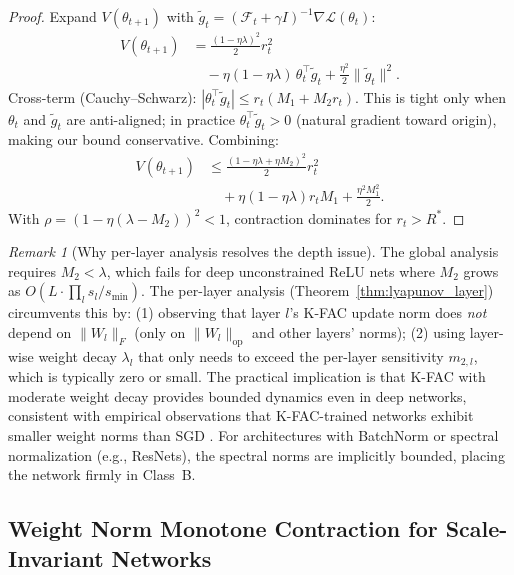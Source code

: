 \documentclass{article}
\providecommand{\FIM}{\mathcal{F}}
\providecommand{\norm}[1]{\lVert #1 \rVert}
\theoremstyle{plain}
\theoremstyle{definition}
\theoremstyle{remark}
\newtheorem{remark}{Remark}
\begin{document}
\begin{proof}
Expand $V(\theta_{t+1})$ with $\tilde{g}_t = (\FIM_t + \gamma I)^{-1}\nabla\mathcal{L}(\theta_t)$:
\begin{align}
    V(\theta_{t+1}) &= \tfrac{(1-\eta\lambda)^2}{2}r_t^2 \nonumber \\
    &\quad - \eta(1\!-\!\eta\lambda)\,\theta_t^\top \tilde{g}_t + \tfrac{\eta^2}{2}\norm{\tilde{g}_t}^2.
\end{align}
Cross-term (Cauchy--Schwarz): $|\theta_t^\top\tilde{g}_t| \leq r_t(M_1 + M_2 r_t)$. This is tight only when $\theta_t$ and $\tilde{g}_t$ are anti-aligned; in practice $\theta_t^\top\tilde{g}_t > 0$ (natural gradient toward origin), making our bound conservative. Combining:
\begin{align}
    V(\theta_{t+1}) &\leq \frac{(1\!-\!\eta\lambda\!+\!\eta M_2)^2}{2}r_t^2 \nonumber \\
    &\quad + \eta(1\!-\!\eta\lambda)r_t M_1 + \frac{\eta^2 M_1^2}{2}.
\end{align}
With $\rho = (1 - \eta(\lambda - M_2))^2 < 1$, contraction dominates for $r_t > R^*$.
\end{proof}

\begin{remark}[Why per-layer analysis resolves the depth issue]
\label{rem:tightness}
The global analysis requires $M_2 < \lambda$, which fails for deep unconstrained ReLU nets where $M_2$ grows as $O(L \cdot \prod_l s_l / s_{\min})$. The per-layer analysis (Theorem~\ref{thm:lyapunov_layer}) circumvents this by: (1) observing that layer $l$'s K-FAC update norm does \emph{not} depend on $\norm{W_l}_F$ (only on $\norm{W_l}_{\mathrm{op}}$ and other layers' norms); (2) using layer-wise weight decay $\lambda_l$ that only needs to exceed the per-layer sensitivity $m_{2,l}$, which is typically zero or small. The practical implication is that K-FAC with moderate weight decay provides bounded dynamics even in deep networks, consistent with empirical observations that K-FAC-trained networks exhibit smaller weight norms than SGD \citep{dohare2024loss}. For architectures with BatchNorm or spectral normalization (e.g., ResNets), the spectral norms are implicitly bounded, placing the network firmly in Class~B.
\end{remark}

\subsection{Weight Norm Monotone Contraction for Scale-Invariant Networks}
\label{sec:weight_contraction}
\end{document}
